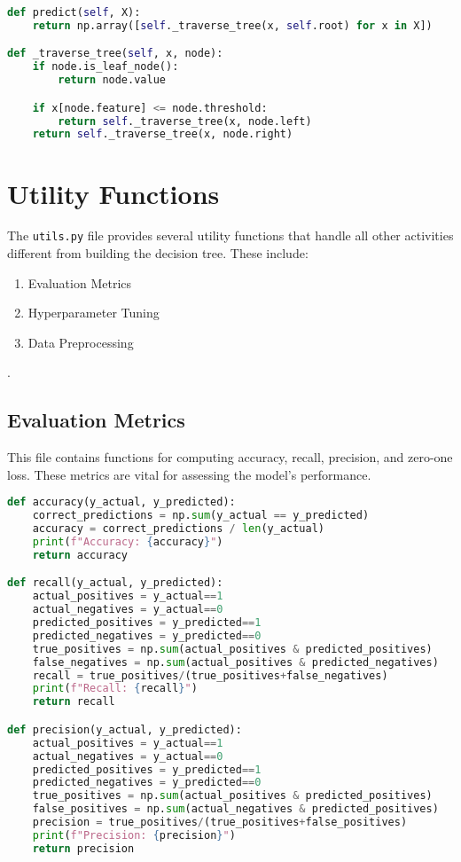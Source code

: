 \documentclass{article}
\begin{document}
\begin{lstlisting}[language=Python, caption=Prediction Method]
def predict(self, X):
    return np.array([self._traverse_tree(x, self.root) for x in X])

def _traverse_tree(self, x, node):
    if node.is_leaf_node():
        return node.value

    if x[node.feature] <= node.threshold:
        return self._traverse_tree(x, node.left)
    return self._traverse_tree(x, node.right)
\end{lstlisting}

\section{Utility Functions}
The \texttt{utils.py} file provides several utility functions that handle all other activities different from building the decision tree. These include:
\begin{enumerate}
    \item Evaluation Metrics
    \item Hyperparameter Tuning
    \item Data Preprocessing
\end{enumerate}
.

\subsection{Evaluation Metrics}
This file contains functions for computing accuracy, recall, precision, and zero-one loss. These metrics are vital for assessing the model's performance.

\begin{lstlisting}[language=Python, caption=Evaluation Metrics]
def accuracy(y_actual, y_predicted):
    correct_predictions = np.sum(y_actual == y_predicted)
    accuracy = correct_predictions / len(y_actual)
    print(f"Accuracy: {accuracy}")
    return accuracy

def recall(y_actual, y_predicted):
    actual_positives = y_actual==1
    actual_negatives = y_actual==0
    predicted_positives = y_predicted==1
    predicted_negatives = y_predicted==0
    true_positives = np.sum(actual_positives & predicted_positives)
    false_negatives = np.sum(actual_positives & predicted_negatives)
    recall = true_positives/(true_positives+false_negatives)
    print(f"Recall: {recall}")
    return recall

def precision(y_actual, y_predicted):
    actual_positives = y_actual==1
    actual_negatives = y_actual==0
    predicted_positives = y_predicted==1
    predicted_negatives = y_predicted==0
    true_positives = np.sum(actual_positives & predicted_positives)
    false_positives = np.sum(actual_negatives & predicted_positives)
    precision = true_positives/(true_positives+false_positives)
    print(f"Precision: {precision}")
    return precision
\end{lstlisting}
\end{document}
